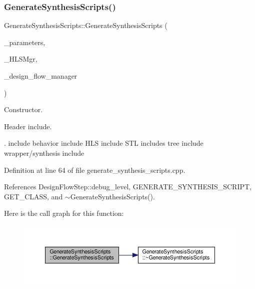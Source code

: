 \subsubsection{\texorpdfstring{Generate\+Synthesis\+Scripts()}{GenerateSynthesisScripts()}}
{\footnotesize\ttfamily Generate\+Synthesis\+Scripts\+::\+Generate\+Synthesis\+Scripts (\begin{DoxyParamCaption}\item[{const \hyperlink{Parameter_8hpp_a37841774a6fcb479b597fdf8955eb4ea}{Parameter\+Const\+Ref}}]{\+\_\+parameters,  }\item[{const \hyperlink{hls__manager_8hpp_acd3842b8589fe52c08fc0b2fcc813bfe}{H\+L\+S\+\_\+manager\+Ref}}]{\+\_\+\+H\+L\+S\+Mgr,  }\item[{const Design\+Flow\+Manager\+Const\+Ref}]{\+\_\+design\+\_\+flow\+\_\+manager }\end{DoxyParamCaption})}



Constructor. 

Header include.

. include behavior include H\+LS include S\+TL includes tree include wrapper/synthesis include 

Definition at line 64 of file generate\+\_\+synthesis\+\_\+scripts.\+cpp.



References Design\+Flow\+Step\+::debug\+\_\+level, G\+E\+N\+E\+R\+A\+T\+E\+\_\+\+S\+Y\+N\+T\+H\+E\+S\+I\+S\+\_\+\+S\+C\+R\+I\+PT, G\+E\+T\+\_\+\+C\+L\+A\+SS, and $\sim$\+Generate\+Synthesis\+Scripts().

Here is the call graph for this function\+:
\nopagebreak
\begin{figure}[H]
\begin{center}
\leavevmode
\includegraphics[width=350pt]{dd/dde/classGenerateSynthesisScripts_a32f5da813140d858eb3876098b5e6924_cgraph}
\end{center}
\end{figure}
\mbox{\label{classGenerateSynthesisScripts_a72a2722bb7f449ac6cd5f733a3a029df}} 
